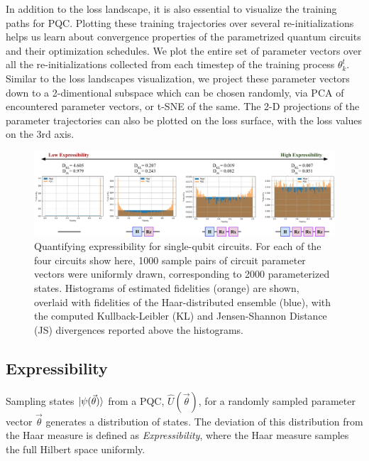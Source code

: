 In addition to the loss landscape, it is also essential to visualize the training paths for PQC. Plotting these training trajectories over several re-initializations helps us learn about convergence properties of the parametrized quantum circuits and their optimization schedules. We plot the entire set of parameter vectors over all the re-initializations collected from each timestep of the training process $\theta_{k}^{t}$. Similar to the loss landscapes visualization, we project these parameter vectors down to a 2-dimentional subspace which can be chosen randomly, via PCA of encountered parameter vectors, or t-SNE of the same. The 2-D projections of the parameter trajectories can also be plotted on the loss surface, with the loss values on the 3rd axis. \cite{training-trajectories}

\begin{figure}[!tp]
    \centering
    \includegraphics[width=\textwidth]{figures/qleet/expressibility.pdf}
    \caption[Quantifying expressibility for single-qubit circuits]{Quantifying expressibility for single-qubit circuits. For each of the four circuits show here, 1000 sample pairs of circuit parameter vectors were uniformly drawn, corresponding to 2000 parameterized states. Histograms of estimated fidelities (orange) are shown, overlaid with fidelities of the Haar-distributed ensemble (blue), with the computed Kullback-Leibler (KL) and Jensen-Shannon Distance (JS) divergences reported above the histograms.}
    \label{qleet-fig:expressibility}
\end{figure}

\subsection{Expressibility}

Sampling states $\ket{\psi(\vec{\theta})}$ from a PQC, $\hat{U}(\vec{\theta})$, for a randomly sampled parameter vector $\vec{\theta}$ generates a distribution of states. The deviation of this distribution from the Haar measure is defined as \textit{Expressibility}, where the Haar measure samples the full Hilbert space uniformly.

